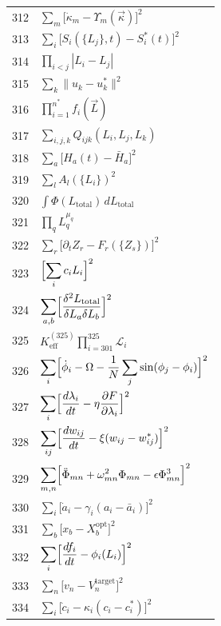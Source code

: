\documentclass[12pt,a4paper]{article}
\begin{document}
\begin{longtable}{r p{}}
	312 & \(\displaystyle \sum_m\bigl[\dot\kappa_m - \Upsilon_m(\vec\kappa)\bigr]^2\) \\
	313 & \(\displaystyle \sum_i\bigl[S_i(\{L_j\},t) - S_i^*(t)\bigr]^2\) \\
	314 & \(\displaystyle \prod_{i<j}|L_i - L_j|\) \\
	315 & \(\displaystyle \sum_k\|u_k - u_k^*\|^2\) \\
	316 & \(\displaystyle \prod_{i=1}^{n^*}f_i(\vec L)\) \\
	317 & \(\displaystyle \sum_{i,j,k}Q_{ijk}(L_i,L_j,L_k)\) \\
	318 & \(\displaystyle \sum_a\bigl[H_a(t) - \bar H_a\bigr]^2\) \\
	319 & \(\displaystyle \sum_l A_l(\{L_i\})^2\) \\
	320 & \(\displaystyle \int\Phi(L_{\text{total}})\,dL_{\text{total}}\) \\
	321 & \(\displaystyle \prod_q L_q^{\mu_q}\) \\
	322 & \(\displaystyle \sum_r\bigl[\partial_t Z_r - F_r(\{Z_s\})\bigr]^2\) \\
	323 & \(\displaystyle \Bigl[\sum_i c_i L_i\Bigr]^2\) \\
	324 & \(\displaystyle \sum_{a,b}\Bigl[\frac{\delta^2 L_{\text{total}}}{\delta L_a\delta L_b}\Bigr]^2\) \\
	325 & \(\displaystyle K^{(325)}_{\mathrm{eff}}\prod_{i=301}^{325}\mathcal{L}_i\) \\
	326 & \(\displaystyle \sum_i\Bigl[\dot\phi_i - \Omega - \frac1N\sum_j\sin(\phi_j-\phi_i)\Bigr]^2\) \\
	327 & \(\displaystyle \sum_i\Bigl[\frac{d\lambda_i}{dt} - \eta\frac{\partial F}{\partial\lambda_i}\Bigr]^2\) \\
	328 & \(\displaystyle \sum_{ij}\Bigl[\frac{dw_{ij}}{dt} - \xi(w_{ij}-w_{ij}^*)\Bigr]^2\) \\
	329 & \(\displaystyle \sum_{m,n}\Bigl[\ddot\Phi_{mn} + \omega_{mn}^2\Phi_{mn} - \epsilon\Phi_{mn}^3\Bigr]^2\) \\
	330 & \(\displaystyle \sum_i\bigl[\dot a_i - \gamma_i(a_i - \bar a_i)\bigr]^2\) \\
	331 & \(\displaystyle \sum_b\bigl[x_b - X_b^{\text{opt}}\bigr]^2\) \\
	332 & \(\displaystyle \sum_i\Bigl[\frac{df_i}{dt} - \phi_i(L_i)\Bigr]^2\) \\
	333 & \(\displaystyle \sum_n\bigl[v_n - V_n^{\text{target}}\bigr]^2\) \\
	334 & \(\displaystyle \sum_i\bigl[\dot c_i - \kappa_i(c_i - c_i^*)\bigr]^2\) \\

\end{longtable}
\end{document}
